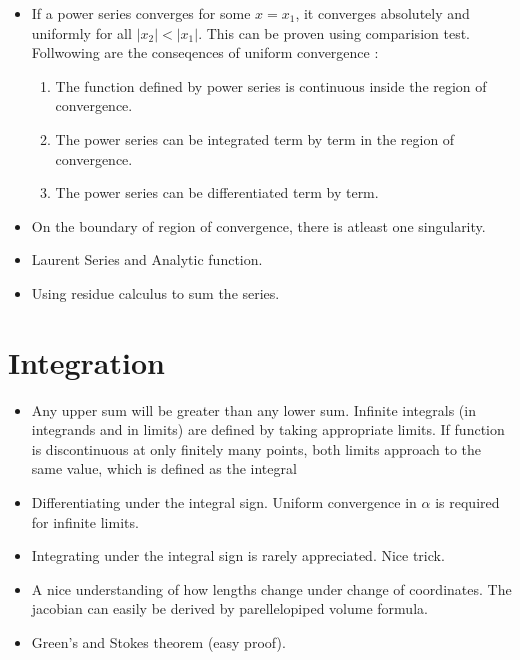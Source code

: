 \documentclass{report}
\begin{document}
\begin{itemize}

\item If a power series converges for some $x=x_1$, it converges absolutely and uniformly for all $|x_2| < |x_1|$. This can be proven using comparision test.\\

Follwowing are the conseqences of uniform convergence :

\begin{enumerate}
\item The function defined by power series is continuous inside the region of convergence. 

\item The power series can be integrated term by term in the region of convergence.

\item The power series can be differentiated term by term.

\end{enumerate}

\item On the boundary of region of convergence, there is atleast one singularity.

\item Laurent Series and Analytic function.

\item Using residue calculus to sum the series.

\end{itemize}

\chapter{Integration}

\begin{itemize}

\item Any upper sum will be greater than any lower sum. Infinite integrals (in integrands and in limits) are defined by taking appropriate limits. If function is discontinuous at only finitely many points, both limits approach to the same value, which is defined as the integral

\item Differentiating under the integral sign. Uniform convergence in $\alpha$ is required for infinite limits.

\item Integrating under the integral sign is rarely appreciated. Nice trick.

\item A nice understanding of how lengths change under change of coordinates. The jacobian can easily be derived by parellelopiped volume formula.

\item Green's and Stokes theorem (easy proof).

\end{itemize}
\end{document}
